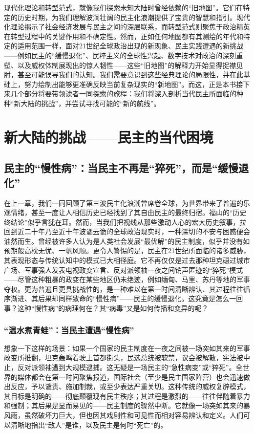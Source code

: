 \documentclass[UTF8, 10pt]{ctexbook}
\begin{document}
现代化理论和转型范式，就像我们探索未知大陆时曾经依赖的“旧地图”。它们在特定的历史时期，为我们理解波澜壮阔的民主化浪潮提供了宝贵的智慧和指引。现代化理论揭示了社会经济发展与民主之间的深层联系，而转型范式则聚焦于政治精英在转型过程中的关键作用和不确定性。然而，正如任何地图都有其测绘的年代和特定的适用范围一样，面对21世纪全球政治出现的新现象、民主实践遭遇的新挑战——例如民主的“缓慢退化”、民粹主义的全球性兴起、数字技术对政治的深刻重塑、以及威权体制展现出的惊人韧性——这些“旧地图”的解释力开始显得捉襟见肘，甚至可能误导我们的认知。我们需要意识到这些经典理论的局限性，并在此基础上，努力绘制出能够更准确反映当前复杂现实的“新地图”。而这，正是本书接下来几个部分将要带领读者一同探索的旅程：我们将深入剖析当代民主所面临的种种“新大陆的挑战”，并尝试寻找可能的“新的航线”。

\part{新大陆的挑战——民主的当代困境}

\chapter{民主的“慢性病”：当民主不再是“猝死”，而是“缓慢退化”}

\lettrine[lines=3]{在}{上一章}，我们一同回顾了第三波民主化浪潮曾席卷全球，为世界带来了普遍的乐观情绪，甚至一度让人相信历史已经找到了其自由民主的最终归宿。福山的“历史终结论”似乎言犹在耳。然而，当我们把视线从那些激动人心的宏大历史叙事，拉回到近二十年乃至近十年波谲云诡的全球政治现实时，一种深切的不安与困惑便会油然而生。曾经被许多人认为是人类社会发展“最优解”的民主制度，似乎并没有如预期般高枕无忧、一帆风顺。更令人警惕的是，民主在21世纪所面临的诸多威胁，其表现形态与传统认知中的模式已大相径庭。它不再仅仅是过去那种坦克碾过城市广场、军事强人发表电视政变宣言、反对派领袖一夜之间销声匿迹的“猝死”模式——尽管这种粗暴的政变在某些地区仍未绝迹，例如缅甸、马里、苏丹等地的军事夺权。更为普遍且更具挑战性的，是一种难以在第一时间清晰辨认、其过程往往循序渐进、其后果却同样致命的“慢性病”——民主的缓慢退化。这究竟是怎么一回事？这种“慢性病”的病理何在？其“病毒”又是如何传播和变异的呢？

\section{“温水煮青蛙”：当民主遭遇“慢性病”}
\lettrine[lines=2]{想}{象}一下这样的场景：如果一个国家的民主制度在一夜之间被一场突如其来的军事政变所推翻，坦克轰鸣着驶上首都街头，民选总统被软禁，议会被解散，宪法被中止，反对派领袖遭到大规模逮捕。这无疑是一场民主的“急性病变”或“猝死”。全世界的媒体都会在第一时间聚焦报道，国际社会（至少是民主国家阵营）也会迅速做出反应，予以谴责、施加制裁，或至少表达严重关切。这种传统的威权复辟模式，其目标是明确的——彻底颠覆现有民主秩序；其过程是激烈的——往往伴随着暴力和强制；其后果是显而易见的——民主制度的骤然中断。它就像一场突如其来的暴风雨，虽然破坏力巨大，但也因其戏剧性和可见性而相对容易辨认和定义。人们可以清晰地指出“敌人”是谁，以及民主是何时“死亡”的。
\end{document}
